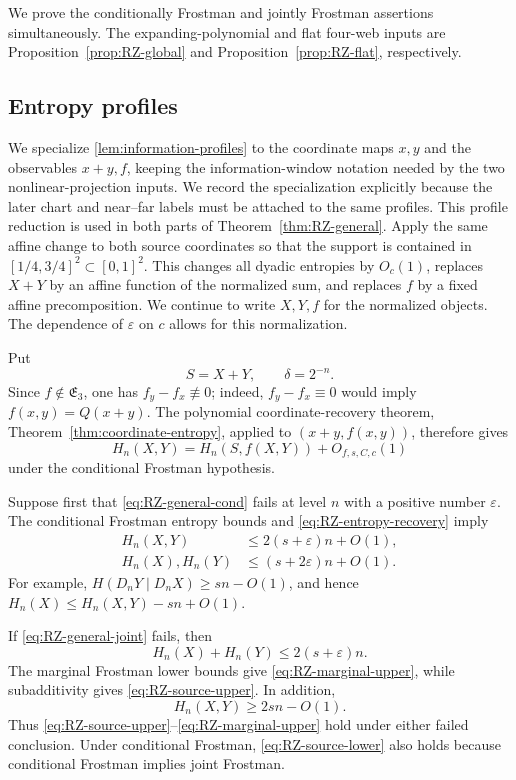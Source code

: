 \documentclass[11pt]{article}
\begin{document}
We prove the conditionally Frostman and jointly Frostman assertions
simultaneously.  The expanding-polynomial and flat four-web inputs
are Proposition~\ref{prop:RZ-global} and
Proposition~\ref{prop:RZ-flat}, respectively.

\subsection{Entropy profiles}

We specialize \cref{lem:information-profiles} to the coordinate
maps \(x,y\) and the observables \(x+y,f\), keeping the information-window
notation needed by the two nonlinear-projection inputs.  We record
the specialization explicitly because the later chart and near--far
labels must be attached to the same profiles.  This profile reduction is used in both parts of
Theorem~\ref{thm:RZ-general}.  Apply the same affine change to both
source coordinates so that the support is contained in
\([1/4,3/4]^2\subset[0,1]^2\).
This changes all dyadic entropies by \(O_c(1)\), replaces \(X+Y\) by
an affine function of the normalized sum, and replaces \(f\) by a
fixed affine precomposition.  We continue to write \(X,Y,f\) for the
normalized objects.  The dependence of \(\varepsilon\) on \(c\) allows
for this normalization.

Put
\[
 S=X+Y,\qquad \delta=2^{-n}.
\]
Since \(f\notin\mathfrak E_3\), one has
\(f_y-f_x\not\equiv0\); indeed, \(f_y-f_x\equiv0\) would imply
\(f(x,y)=Q(x+y)\).  The polynomial coordinate-recovery theorem,
Theorem~\ref{thm:coordinate-entropy}, applied to
\((x+y,f(x,y))\), therefore
gives
\begin{equation}
 H_n(X,Y)=H_n(S,f(X,Y))+O_{f,s,C,c}(1)
 \label{eq:RZ-entropy-recovery}
\end{equation}
under the conditional Frostman hypothesis.

Suppose first that \eqref{eq:RZ-general-cond} fails at
level \(n\) with a positive number \(\varepsilon\).  The conditional
Frostman entropy bounds and \eqref{eq:RZ-entropy-recovery} imply
\begin{align}
 H_n(X,Y)&\le2(s+\varepsilon)n+O(1),
 \label{eq:RZ-source-upper}\\
 H_n(X),H_n(Y)&\le(s+2\varepsilon)n+O(1).
 \label{eq:RZ-marginal-upper}
\end{align}
For example,
\(H(D_nY\mid D_nX)\ge sn-O(1)\), and hence
\(H_n(X)\le H_n(X,Y)-sn+O(1)\).

If \eqref{eq:RZ-general-joint} fails, then
\[
 H_n(X)+H_n(Y)\le2(s+\varepsilon)n.
\]
The marginal Frostman lower bounds give
\eqref{eq:RZ-marginal-upper}, while subadditivity gives
\eqref{eq:RZ-source-upper}.  In addition,
\begin{equation}
 H_n(X,Y)\ge2sn-O(1).
 \label{eq:RZ-source-lower}
\end{equation}
Thus \eqref{eq:RZ-source-upper}--\eqref{eq:RZ-marginal-upper}
hold under either failed conclusion.  Under conditional Frostman,
\eqref{eq:RZ-source-lower} also holds because conditional Frostman
implies joint Frostman.
\end{document}
